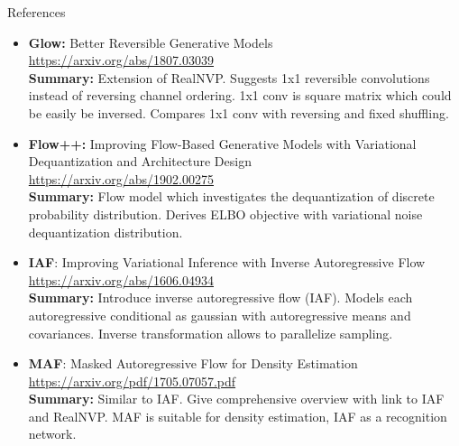 \documentclass{beamer}
\begin{document}
\begin{frame}{References}
	{\scriptsize
		\begin{itemize}
			
			\item \textbf{Glow:} Better Reversible Generative Models \\
			\href{https://arxiv.org/abs/1807.03039}{https://arxiv.org/abs/1807.03039} \\
			\textbf{Summary:} Extension of RealNVP. Suggests 1x1 reversible convolutions instead of reversing channel ordering. 1x1 conv is square matrix which could be easily be inversed. Compares 1x1 conv with reversing and fixed shuffling. 
			
			\item \textbf{Flow++:} Improving Flow-Based Generative Models with Variational Dequantization and Architecture Design \\
			\href{https://arxiv.org/abs/1902.00275}{https://arxiv.org/abs/1902.00275} \\
			\textbf{Summary:} Flow model which investigates the dequantization of discrete probability distribution. Derives ELBO objective with variational noise dequantization distribution. 
			
			\item \textbf{IAF}: Improving Variational Inference with Inverse Autoregressive Flow \\
			\href{https://arxiv.org/abs/1606.04934}{https://arxiv.org/abs/1606.04934} \\
			\textbf{Summary:} Introduce inverse autoregressive flow (IAF). Models each autoregressive conditional as gaussian with autoregressive means and covariances. Inverse transformation allows to parallelize sampling.
			
			\item \textbf{MAF}: Masked Autoregressive Flow for Density Estimation \\ 
			\href{https://arxiv.org/pdf/1705.07057.pdf}{https://arxiv.org/pdf/1705.07057.pdf} \\
			\textbf{Summary:} Similar to IAF. Give comprehensive overview with link to IAF and RealNVP.  MAF is suitable for density estimation, IAF as a recognition network.
		\end{itemize}
	}
\end{frame}
\end{document}
